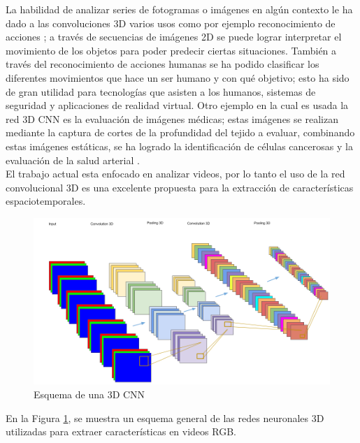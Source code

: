 \begin{onehalfspacing}
La habilidad de analizar series de fotogramas o imágenes en algún contexto le ha dado a las convoluciones 3D varios usos como por ejemplo reconocimiento de acciones \cite{Yang2017DeepImages}; a través de secuencias de imágenes 2D se puede lograr interpretar el movimiento de los objetos para poder predecir ciertas situaciones. También a través del reconocimiento de acciones humanas se ha podido clasificar  los diferentes movimientos que hace un ser humano y con qué objetivo; esto ha sido de gran utilidad para tecnologías que asisten a los humanos, sistemas de seguridad y aplicaciones de realidad virtual. Otro ejemplo en la cual es usada la red 3D CNN es la evaluación de imágenes médicas; estas imágenes se realizan mediante la captura de cortes de la profundidad del tejido a evaluar, combinando estas imágenes estáticas, se ha logrado la identificación de células cancerosas y la evaluación de la salud arterial \cite{Ji20133DRecognition}.\\

El trabajo actual esta enfocado en analizar videos, por lo tanto el uso de la red convolucional 3D es una excelente propuesta para la extracción de características espaciotemporales.

\begin{figure}[th]
	\centering
	\includegraphics[width=17cm,keepaspectratio]{XX_Figures/Fig_3DCNN_Esquema.png}
	\caption{\footnotesize Esquema de una 3D CNN}
	\label{fig:Fig_3DCNN_Esquema}
\end{figure}

En la Figura \ref{fig:Fig_3DCNN_Esquema}, se muestra un esquema general de las redes neuronales 3D utilizadas para extraer características en videos RGB.


\end{onehalfspacing}